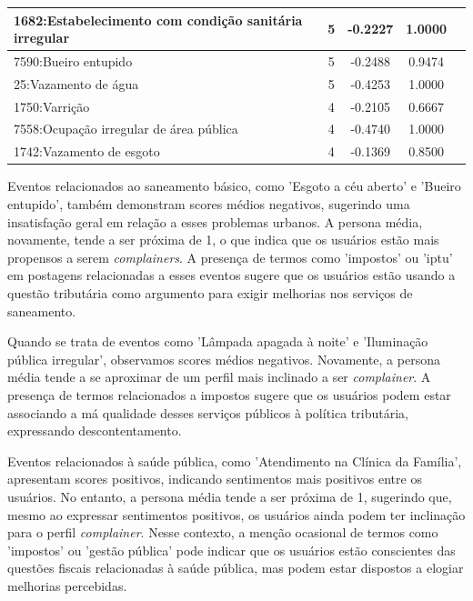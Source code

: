 \begin{table}[htbp]
\begin{tabular}{|l|c|c|c|c|}
		\hline
		1682:Estabelecimento com condição sanitária irregular & 5                & -0.2227        & 1.0000           \\
		\hline
		7590:Bueiro entupido                                  & 5                & -0.2488        & 0.9474           \\
		\hline
		25:Vazamento de água                                  & 5                & -0.4253        & 1.0000           \\
		\hline
		1750:Varrição                                         & 4                & -0.2105        & 0.6667           \\
		\hline
		7558:Ocupação irregular de área pública               & 4                & -0.4740        & 1.0000           \\
		\hline
		1742:Vazamento de esgoto                              & 4                & -0.1369        & 0.8500           \\
		\hline
	\end{tabular}
\end{table}

Eventos relacionados ao saneamento básico, como 'Esgoto a céu aberto' e 'Bueiro entupido', também demonstram scores médios negativos, sugerindo uma insatisfação geral em relação a esses problemas urbanos. A persona média, novamente, tende a ser próxima de 1, o que indica que os usuários estão mais propensos a serem \textit{complainers}. A presença de termos como 'impostos' ou 'iptu' em postagens relacionadas a esses eventos sugere que os usuários estão usando a questão tributária como argumento para exigir melhorias nos serviços de saneamento.

Quando se trata de eventos como 'Lâmpada apagada à noite' e 'Iluminação pública irregular', observamos scores médios negativos. Novamente, a persona média tende a se aproximar de um perfil mais inclinado a ser \textit{complainer}. A presença de termos relacionados a impostos sugere que os usuários podem estar associando a má qualidade desses serviços públicos à política tributária, expressando descontentamento.

Eventos relacionados à saúde pública, como 'Atendimento na Clínica da Família', apresentam scores positivos, indicando sentimentos mais positivos entre os usuários. No entanto, a persona média tende a ser próxima de 1, sugerindo que, mesmo ao expressar sentimentos positivos, os usuários ainda podem ter inclinação para o perfil \textit{complainer}. Nesse contexto, a menção ocasional de termos como 'impostos' ou 'gestão pública' pode indicar que os usuários estão conscientes das questões fiscais relacionadas à saúde pública, mas podem estar dispostos a elogiar melhorias percebidas.

